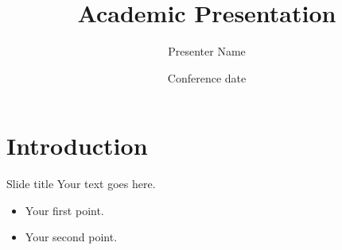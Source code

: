 \documentclass[aspectratio=169,11pt]{beamer}
\title{Academic Presentation}
\author{Presenter Name}
\date{Conference date}
\begin{document}
\IAITitlePage
\IAIOutline

\section{Introduction}
\IAISectionPage

\begin{frame}{Slide title}
  Your text goes here.
  \begin{itemize}
    \item Your first point.
    \item Your second point.
  \end{itemize}
\end{frame}
\end{document}
